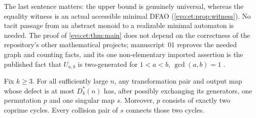 \documentclass[11pt,a4paper]{article}
\numberwithin{equation}{section}
\theoremstyle{definition}
\theoremstyle{remark}
\begin{document}
The last sentence matters: the upper bound is genuinely universal, whereas
the equality witness is an actual accessible minimal DFAO
(\cref{evo:et:prop:witness}). No tacit passage from an abstract monoid to a
realizable minimal automaton is needed. The proof of \cref{evo:et:thm:main}
does not depend on the correctness of the repository's other mathematical
projects; manuscript~01 reproves the needed graph and counting facts, and its
one non-elementary imported assertion is the published fact that $U_{a,b}$
is two-generated for $1<a<b$, $\gcd(a,b)=1$ \cite[Theorem~8]{HolzerKoenig2004}.

\begin{proposition}\label{evo:et:prop:separation}
Fix $k\ge3$. For all sufficiently large $n$, any transformation pair and
output map whose defect is at most $D^*_k(n)$ has, after possibly exchanging
its generators, one permutation $p$ and one singular map $s$. Moreover, $p$
consists of exactly two coprime cycles. Every collision pair of $s$ connects
those two cycles.
\end{proposition}
\end{document}
